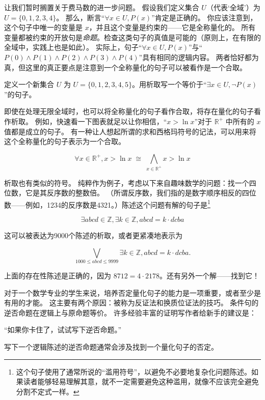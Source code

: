 让我们暂时搁置关于费马数的进一步问题。
假设我们定义集合 $U$（代表‘全域’）为 $U=\{0,1,2,3,4\}$。
那么，断言“$\forall x \in U, P(x)$”肯定是正确的。
你应该注意到，这个句子中唯一的变量是 $x$，并且这个变量是约束的——它是全称量化的。
所有变量都被约束的开放句是{\em 命题}。检查这类句子的真值是可能的（原则上，在有限的全域中，实践上也是如此）。
实际上，句子“$\forall x \in U, P(x)$”与“$P(0) \land P(1) \land P(2) \land P(3)  \land P(4)$”具有相同的逻辑内容。
两者恰好都为真，但这里的真正要点是注意到一个全称量化的句子可以被看作是一个合取。

\begin{exer}
定义一个新集合 $U$ 为 $U=\{0,1,2,3,4,5\}$。用析取写一个等价于“$\exists x \in U, {\lnot}P(x)$”的句子。
\end{exer}

即使在处理无限全域时，也可以将全称量化的句子看作合取，将存在量化的句子看作析取。
例如，快速看一下图表就足以让你相信，“$ x > \ln x $”对于 ${\mathbb R}^+$ 中所有的 $x$ 值都是成立的句子。
有一种让人想起所谓的求和西格玛符号的记法，可以用来将这个全称量化的句子表示为一个合取。

\[
\forall x \in {\mathbb R}^+, x > \ln x \; \cong \; \bigwedge_{x \in {\mathbb R}^+} x > \ln x
\]

析取也有类似的符号。
纯粹作为例子，考虑以下来自趣味数学的问题：找一个四位数，它是其反序数的整数倍。
（所谓反序数，我们指的是数字顺序相反的四位数——例如，1234的反序数是4321。）陈述这个问题有解的句子是\footnote{这个句子使用了通常所说的“滥用符号”，以避免不必要地复杂化问题陈述。如果读者能够轻易理解其意，就不一定需要避免这种滥用，就像不应该完全避免分割不定式一样。}

\[
\exists abcd \in {\mathbb Z},  \exists k \in {\mathbb Z}, abcd = k\cdot dcba
\]

这可以被表达为9000个陈述的析取，或者更紧凑地表示为

\[
\bigvee_{1000\leq abcd \leq 9999}  \exists k \in {\mathbb Z}, abcd = k\cdot dcba.
\]

\begin{exer} 
上面的存在性陈述是正确的，因为 $8712 = 4\cdot 2178$。还有另外一个解——找到它！
\end{exer}

对于一个数学专业的学生来说，培养否定量化句子的能力是一项重要，或者至少是有用的才能。
这主要有两个原因：被称为反证法和换质位证法的技巧。
条件句的逆否命题在逻辑上与原命题等价。
许多经验丰富的证明写作者给新手的建议是：

“如果你卡住了，试试写下逆否命题。”

写下一个逻辑陈述的逆否命题通常会涉及找到一个量化句子的否定。

